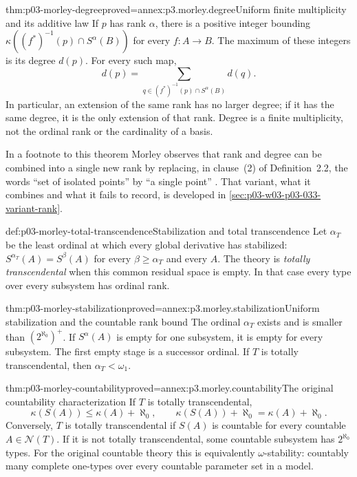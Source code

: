 \begin{hbtheorem}{thm:p03-morley-degree}{proved=annex:p3.morley.degree}{Uniform finite multiplicity and its additive law}
If \(p\) has rank \(\alpha\), there is a positive integer bounding
\(\kappa((f^*)^{-1}(p)\cap S^\alpha(B))\) for every
\(f:A\to B\). The maximum of these integers is its degree
\(d(p)\). For every such map,
\[
 d(p)=\sum_{q\in(f^*)^{-1}(p)\cap S^\alpha(B)}d(q).
\]
In particular, an extension of the same rank has no larger degree;
if it has the same degree, it is the only extension of that rank.
Degree is a finite multiplicity, not the ordinal rank or the
cardinality of a basis.
\end{hbtheorem}

In a footnote to this theorem Morley observes that rank and degree can be
combined into a single new rank by replacing, in clause~(2) of
Definition~2.2, the words ``set of isolated points'' by ``a single point''
\cite[p.~521, n.~13]{Morley1965}. That variant, what it combines and what
it fails to record, is developed in
\cref{sec:p03-w03-p03-033-variant-rank}.

\begin{hbdefinition}{def:p03-morley-total-transcendence}{Stabilization and total transcendence}
Let \(\alpha_T\) be the least ordinal at which every global derivative
has stabilized: \(S^{\alpha_T}(A)=S^\beta(A)\) for every
\(\beta\geq\alpha_T\) and every \(A\). The theory is
\emph{totally transcendental} when this common residual space is empty.
In that case every type over every subsystem has ordinal rank.
\end{hbdefinition}

\begin{hbtheorem}{thm:p03-morley-stabilization}{proved=annex:p3.morley.stabilization}{Uniform stabilization and the countable rank bound}
The ordinal \(\alpha_T\) exists and is smaller than
\((2^{\aleph_0})^+\). If \(S^\alpha(A)\) is empty for one
subsystem, it is empty for every subsystem. The first empty stage is a
successor ordinal. If \(T\) is totally transcendental, then
\(\alpha_T<\omega_1\).
\end{hbtheorem}

\begin{hbtheorem}{thm:p03-morley-countability}{proved=annex:p3.morley.countability}{The original countability characterization}
If \(T\) is totally transcendental,
\[
 \kappa(S(A))\leq\kappa(A)+\aleph_0,
 \qquad
 \kappa(S(A))+\aleph_0=\kappa(A)+\aleph_0.
\]
Conversely, \(T\) is totally transcendental if \(S(A)\) is countable
for every countable \(A\in\mathcal N(T)\). If it is not totally
transcendental, some countable subsystem has \(2^{\aleph_0}\) types.
For the original countable theory this is equivalently
\(\omega\)-stability: countably many complete one-types over every
countable parameter set in a model.
\end{hbtheorem}

